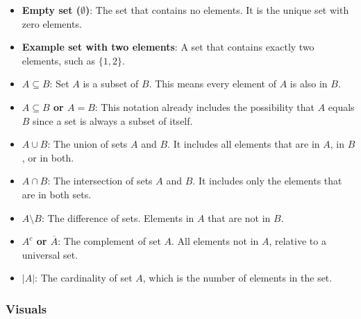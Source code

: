 \begin{itemize}[label=\(-\)]
	\item \textbf{Empty set (\(\emptyset\))}: The set that contains no elements. It is the unique set with zero elements.

	\item \textbf{Example set with two elements}: A set that contains exactly two elements, such as \(\{1, 2\}\).

	\item \textbf{\(A \subseteq B\)}: Set \(A\) is a subset of \(B\). This means every element of \(A\) is also in \(B\).

	\item \textbf{\(A \subseteq B\) or \(A = B\)}: This notation already includes the possibility that \(A\) equals \(B\) since a set is always a subset of itself.

	\item \textbf{\(A \cup B\)}: The union of sets \(A\) and \(B\). It includes all elements that are in \(A\), in \(B\), or in both.

	\item \textbf{\(A \cap B\)}: The intersection of sets \(A\) and \(B\). It includes only the elements that are in both sets.

	\item \textbf{\(A \setminus B\)}: The difference of sets. Elements in \(A\) that are not in \(B\).

	\item \textbf{\(A^c\) or \(\overline{A}\)}: The complement of set \(A\). All elements not in \(A\), relative to a universal set.

	\item \textbf{\(|A|\)}: The cardinality of set \(A\), which is the number of elements in the set.
\end{itemize}

\smallskip
\subsubsection{Visuals}

